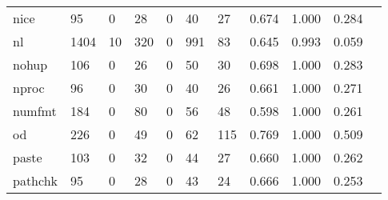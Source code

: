 \begin{longtable}{lp{1.10cm}p{1.10cm}p{1.10cm}p{1.10cm}p{1.10cm}p{1.10cm}p{1.10cm}p{1.10cm}p{1.10cm}p{1.10cm}}
nice      &                     95 &                                  0 &                                28 &                                0 &                                40 &                              27 &                          0.674 &                                 1.000 &                               0.284 \\
nl        &                   1404 &                                 10 &                               320 &                                0 &                               991 &                              83 &                          0.645 &                                 0.993 &                               0.059 \\
nohup     &                    106 &                                  0 &                                26 &                                0 &                                50 &                              30 &                          0.698 &                                 1.000 &                               0.283 \\
nproc     &                     96 &                                  0 &                                30 &                                0 &                                40 &                              26 &                          0.661 &                                 1.000 &                               0.271 \\
numfmt    &                    184 &                                  0 &                                80 &                                0 &                                56 &                              48 &                          0.598 &                                 1.000 &                               0.261 \\
od        &                    226 &                                  0 &                                49 &                                0 &                                62 &                             115 &                          0.769 &                                 1.000 &                               0.509 \\
paste     &                    103 &                                  0 &                                32 &                                0 &                                44 &                              27 &                          0.660 &                                 1.000 &                               0.262 \\
pathchk   &                     95 &                                  0 &                                28 &                                0 &                                43 &                              24 &                          0.666 &                                 1.000 &                               0.253 \\

\end{longtable}
